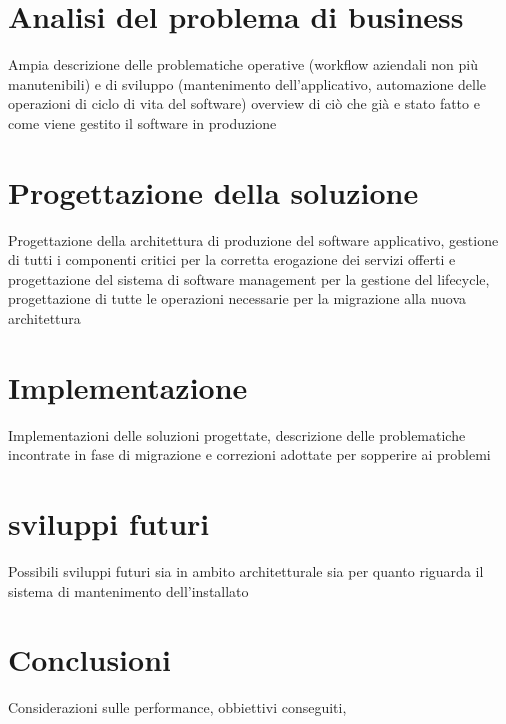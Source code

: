 \documentclass[12pt,a4paper,twoside,openright]{book}
\begin{document}
\chapter{Analisi del problema di business}
Ampia descrizione delle problematiche operative (workflow aziendali non più manutenibili) e di sviluppo (mantenimento dell'applicativo, automazione delle operazioni di ciclo di vita del software) overview di ciò che già e stato fatto e come viene gestito il software in produzione

\chapter{Progettazione della soluzione}
Progettazione della architettura di produzione del software applicativo, gestione di tutti i componenti critici per la corretta erogazione dei servizi offerti e progettazione del sistema di software management per la gestione del lifecycle, progettazione di tutte le operazioni necessarie per la migrazione alla nuova architettura

\chapter{Implementazione}
Implementazioni delle soluzioni progettate, descrizione delle problematiche incontrate in fase di migrazione e correzioni adottate per sopperire ai problemi

\chapter{sviluppi futuri}
Possibili sviluppi futuri sia in ambito architetturale sia per quanto riguarda il sistema di mantenimento dell'installato

\chapter{Conclusioni}
Considerazioni sulle performance, obbiettivi conseguiti,

\backmatter
{}

%
\end{document}
